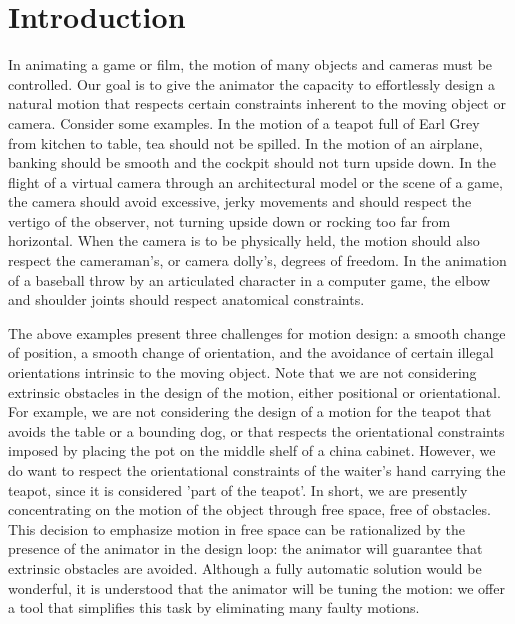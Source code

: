 \documentclass[12pt]{article}
\begin{document}
\section{Introduction}

In animating a game or film, the motion of many objects and cameras must be controlled.
Our goal is to give the animator the capacity to effortlessly design 
a natural motion that respects 
certain constraints inherent to the moving object or camera.
Consider some examples.
In the motion of a teapot full of Earl Grey from kitchen to table,
tea should not be spilled.
In the motion of an airplane,
banking should be smooth and the cockpit should not turn upside down.
In the flight of a virtual camera through an architectural model or the scene of a game,
the camera should avoid excessive, jerky movements and 
should respect the vertigo of the observer, not turning upside down
or rocking too far from horizontal.
When the camera is to be physically held, the motion
should also respect the cameraman's, or camera dolly's, degrees of freedom.
In the animation of a baseball throw by an articulated character in a computer game,
the elbow and shoulder joints should respect anatomical constraints.

The above examples present three challenges for motion design: %
a smooth change of position, a smooth change of orientation, 
and the avoidance of certain illegal orientations intrinsic to the moving object.
Note that we are not considering extrinsic obstacles in the design 
of the motion, either positional or orientational.
For example, we are not considering the design of a motion for the teapot that avoids
the table or a bounding dog, or that respects the orientational constraints 
imposed by placing the pot on the middle shelf of a china cabinet.
However, we do want to respect the orientational constraints of the waiter's hand 
carrying the teapot, since it is considered 'part of the teapot'.
In short, we are presently concentrating on the motion of the object through free space,
free of obstacles.
This decision to emphasize motion in free space can be 
rationalized by the presence of the animator in the design loop:
the animator will guarantee that extrinsic obstacles are avoided.
Although a fully automatic solution would be wonderful,
it is understood that the animator will be tuning the motion:
we offer a tool that simplifies this task by eliminating many faulty motions.
\end{document}
